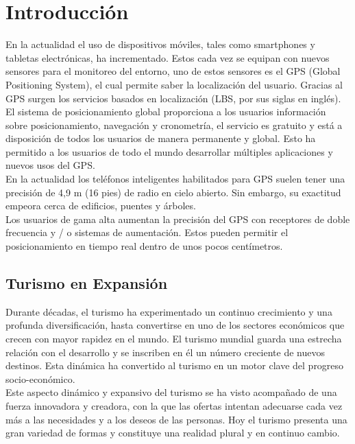 \chapter{Introducción}

En la actualidad el uso de dispositivos móviles, tales como smartphones y tabletas electrónicas, ha incrementado. Estos cada vez se equipan con nuevos sensores para el monitoreo del entorno, uno de estos sensores es el GPS (Global Positioning System), el cual permite saber la localización del usuario. Gracias al GPS surgen los servicios basados en localización (LBS, por sus siglas en inglés).\\

El sistema de posicionamiento global proporciona a los usuarios información sobre posicionamiento, navegación y cronometría, el servicio es gratuito y está a disposición de todos los usuarios de manera permanente y global. Esto  ha permitido a los usuarios de todo el mundo desarrollar múltiples aplicaciones y nuevos usos del GPS.\\

En la actualidad los teléfonos inteligentes habilitados para GPS suelen tener una precisión de 4,9 m (16 pies) de radio en cielo abierto. Sin embargo, su exactitud empeora cerca de edificios, puentes y árboles.\\

Los usuarios de gama alta aumentan la precisión del GPS con receptores de doble frecuencia y / o sistemas de aumentación. Estos pueden permitir el posicionamiento en tiempo real dentro de unos pocos centímetros.\cite{gps}




\section{Turismo en Expansión}



Durante décadas, el turismo ha experimentado un continuo crecimiento y una profunda diversificación, hasta convertirse en uno de los sectores económicos que crecen con mayor rapidez en el mundo. El turismo mundial guarda una estrecha relación con el desarrollo y se inscriben en él un número creciente de nuevos destinos. Esta dinámica ha convertido al turismo en un motor clave del progreso socio-económico. \\

Este aspecto dinámico y expansivo del turismo se ha visto acompañado de una fuerza innovadora y creadora, con la que las ofertas intentan adecuarse cada vez más a las necesidades y a los deseos de las personas. Hoy el turismo presenta una gran variedad de formas y constituye una realidad plural y en continuo cambio.\\

